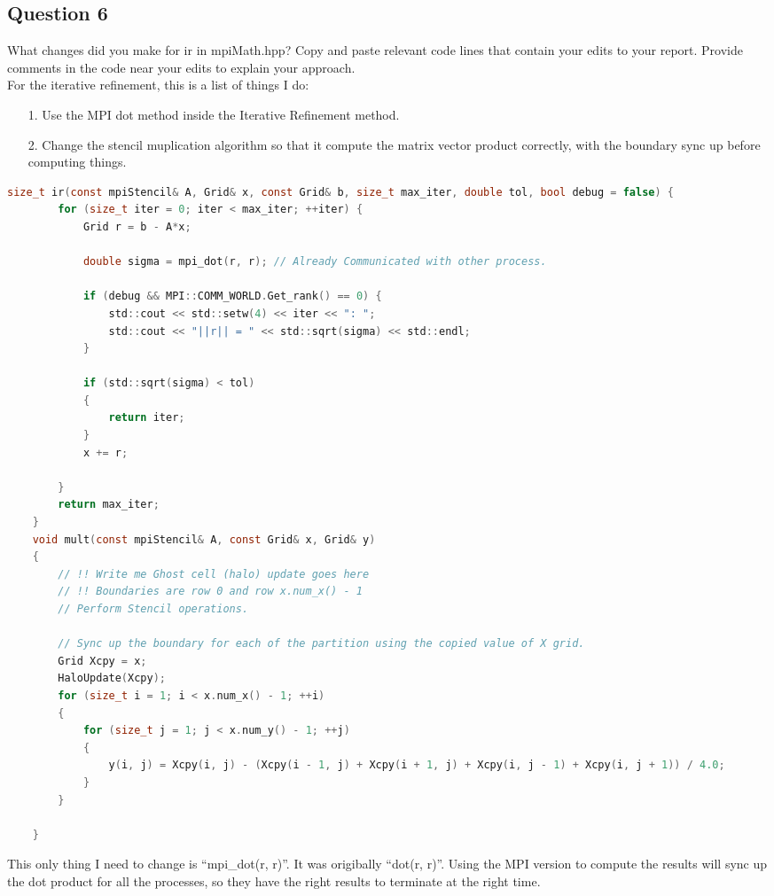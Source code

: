 \documentclass[]{article}
\begin{document}
            \subsection*{Question 6}
                What changes did you make for ir in mpiMath.hpp? Copy and paste relevant code lines that contain your edits to your report. Provide comments in the code near your edits to explain your approach.
                \\[1.1em]
                For the iterative refinement, this is a list of things I do: 
                \begin{enumerate}
                    \item[1.] Use the MPI dot method inside the Iterative Refinement method.
                    \item[2.] Change the stencil muplication algorithm so that it compute the matrix vector product correctly, with the boundary sync up before computing things.  
                \end{enumerate}
                \begin{lstlisting}[language=c]
    size_t ir(const mpiStencil& A, Grid& x, const Grid& b, size_t max_iter, double tol, bool debug = false) {
        for (size_t iter = 0; iter < max_iter; ++iter) {
            Grid r = b - A*x;

            double sigma = mpi_dot(r, r); // Already Communicated with other process. 

            if (debug && MPI::COMM_WORLD.Get_rank() == 0) {
                std::cout << std::setw(4) << iter << ": ";
                std::cout << "||r|| = " << std::sqrt(sigma) << std::endl;
            }

            if (std::sqrt(sigma) < tol) 
            {
                return iter;
            }
            x += r;
        
        }
        return max_iter;
    }
    void mult(const mpiStencil& A, const Grid& x, Grid& y) 
    {
        // !! Write me Ghost cell (halo) update goes here
        // !! Boundaries are row 0 and row x.num_x() - 1
        // Perform Stencil operations. 

        // Sync up the boundary for each of the partition using the copied value of X grid. 
        Grid Xcpy = x;
        HaloUpdate(Xcpy);
        for (size_t i = 1; i < x.num_x() - 1; ++i) 
        {
            for (size_t j = 1; j < x.num_y() - 1; ++j) 
            {
                y(i, j) = Xcpy(i, j) - (Xcpy(i - 1, j) + Xcpy(i + 1, j) + Xcpy(i, j - 1) + Xcpy(i, j + 1)) / 4.0;
            }
        }

    }
                \end{lstlisting}
                This only thing I need to change is ``mpi\_dot(r, r)''. It was origibally ``dot(r, r)''. Using the MPI version to compute the results will sync up the dot product for all the processes, so they have the right results to terminate at the right time. 
\end{document}

